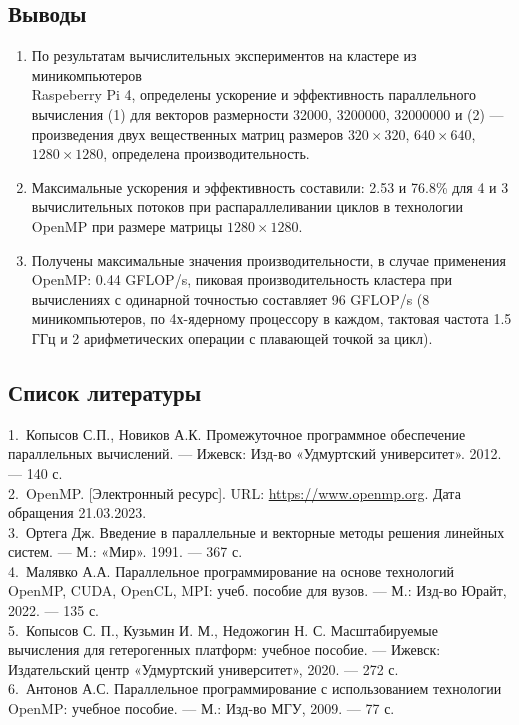 \subsection*{Выводы}
\begin{enumerate}
\item По результатам вычислительных экспериментов на кластере из миникомпьютеров \\Raspeberry Pi 4, определены ускорение и эффективность параллельного вычисления (1) для векторов размерности 32000, 3200000, 32000000 и %
(2) --- произведения двух вещественных матриц размеров $320\times 320$, $640\times 640$, $1280\times 1280$, определена производительность. 
\item Максимальные ускорения и эффективность составили: 2.53 и 76.8\%
 для 4 и 3 вычислительных потоков при распараллеливании циклов в технологии OpenMP при размере матрицы $1280\times 1280$. 
\item Получены максимальные значения производительности, в случае применения OpenMP:  0.44 GFLOP/s, пиковая производительность кластера при вычислениях с одинарной точностью составляет 96 GFLOP/s (8 миникомпьютеров, по 4х-ядерному процессору в каждом, тактовая частота 1.5 ГГц и 2 арифметических операции с плавающей точкой за цикл).
\end{enumerate}

\subsection*{Список литературы}
1.~Копысов С.П., Новиков А.К. Промежуточное программное обеспечение параллельных вычислений. --- Ижевск: Изд-во «Удмуртский университет». 2012. --- 140 с.\\
2.~OpenMP. [Электронный ресурс]. URL: \url{https://www.openmp.org}. 
 Дата обращения 21.03.2023.\\
3.~Ортега Дж. Введение в параллельные и векторные методы решения линейных систем. --- М.: «Мир». 1991. --- 367 с.\\ 
4.~Малявко А.А. Параллельное программирование на основе технологий OpenMP, CUDA, OpenCL, MPI: учеб. пособие для вузов. --- М.: Изд-во Юрайт, 2022. --- 135 с.\\ 
5.~Копысов С. П., Кузьмин И. М., Недожогин Н. С. Масштабируемые вычисления для гетерогенных платформ: учебное пособие. --- Ижевск: Издательский центр «Удмуртский университет», 2020. --- 272 с.\\ 
6.~Антонов А.С. Параллельное программирование с использованием технологии OpenMP: учебное пособие. --- М.: Изд-во МГУ, 2009. --- 77 с.
